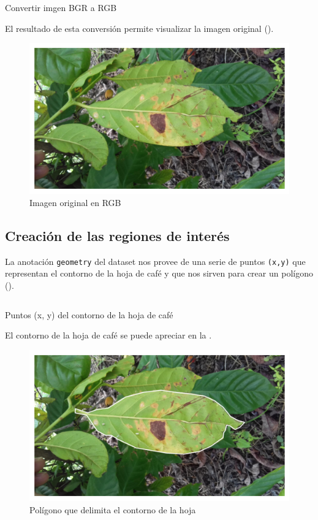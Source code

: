 \begin{listing}[H]
\inputminted{python}{code_listings/bgr_to_rgb.py}
\caption{Convertir imgen BGR a RGB}
\label{code:bgr_to_rgb}
\end{listing}

El resultado de esta conversión permite visualizar la imagen original ().

\begin{figure}[H]
\centering
\includegraphics[scale=1]{images/original_image.png}
\caption{Imagen original en RGB}
\label{img:original}
\end{figure}

\subsection{Creación de las regiones de interés}
La anotación \texttt{geometry} del dataset nos provee de una serie de puntos \texttt{(x,y)} que representan el contorno de la hoja de café y que nos sirven para crear un polígono ().

\begin{listing}[H]
\inputminted{python}{code_listings/polygon.py}
\caption{Puntos (x, y) del contorno de la hoja de café}
\label{code:polygon}
\end{listing}

El contorno de la hoja de café se puede apreciar en la .

\begin{figure}[H]
\centering
\includegraphics[scale=1]{images/polygon.png}
\caption{Polígono que delimita el contorno de la hoja}
\label{img:polygon}
\end{figure}

